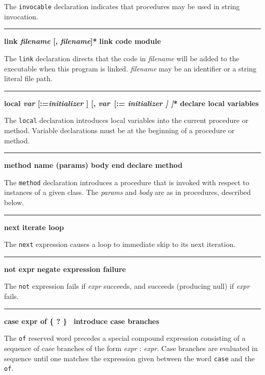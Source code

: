 \noindent
The \texttt{invocable} declaration indicates that procedures may be used
in string invocation.

\bigskip\hrule\vspace{0.1cm}
\noindent
{\bf \textbf{link} \textit{filename} [, \textit{filename}]* } \hfill {\bf link code module}

\noindent
The \texttt{link} declaration directs that the code in
\textit{filename} will be added to the executable when this program is
linked. \textit{filename} may be an identifier or a string literal file
path.

\bigskip\hrule\vspace{0.1cm}
\noindent
{\bf \textbf{local} \textit{var} [:=\textit{initializer} ] [, \textit{var}\ [:=\textit{ initializer ] ]}* } \hfill {\bf declare local variables}

\noindent
{}The \texttt{local} declaration introduces local
variables into the current procedure or method.
Variable declarations must be at the beginning of a
procedure or method.

\bigskip\hrule\vspace{0.1cm}
\noindent
{\bf method name (params) body end } \hfill {\bf declare method}

\noindent
{}The \texttt{method} declaration introduces a procedure
that is invoked with respect to instances of
a given class. The \textit{params} and \textit{body}
are as in procedures, described below.

\bigskip\hrule\vspace{0.1cm}
\noindent
{\bf next } \hfill {\bf iterate loop}

\noindent
{}The \texttt{next} expression causes a loop to
immediate skip to its next iteration.

\bigskip\hrule\vspace{0.1cm}
\noindent
{\bf not expr } \hfill {\bf negate expression failure}

\noindent
{}The \texttt{not} expression fails if \textit{expr} succeeds,
and succeeds (producing null) if \textit{expr} fails.

\bigskip\hrule\vspace{0.1cm}
\noindent
{\bf case expr of \{ ? \}\ } \hfill {\bf introduce case branches}

\noindent
{}The \texttt{of} reserved word precedes a special compound
expression consisting of a sequence of case branches of the form
\textit{expr} : \textit{expr}. Case branches are evaluated in sequence
until one matches the expression given between the word
\texttt{case} and the \texttt{of}.

